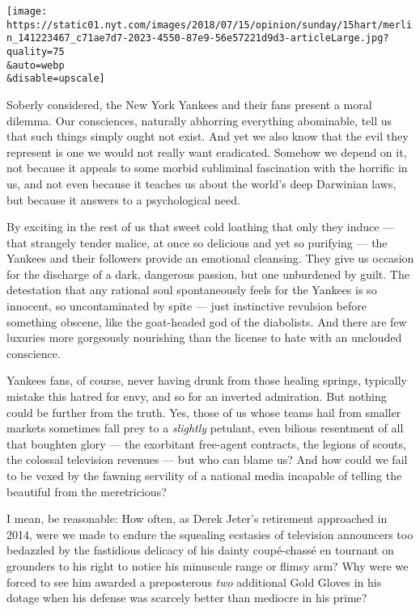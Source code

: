 \texttt{[image: https://static01.nyt.com/images/2018/07/15/opinion/sunday/15hart/merlin\_141223467\_c71ae7d7-2023-4550-87e9-56e57221d9d3-articleLarge.jpg?quality=75\\\&auto=webp\\\&disable=upscale]}

Soberly considered, the New York Yankees and their fans present a moral
dilemma. Our consciences, naturally abhorring everything abominable,
tell us that such things simply ought not exist. And yet we also know
that the evil they represent is one we would not really want eradicated.
Somehow we depend on it, not because it appeals to some morbid
subliminal fascination with the horrific in us, and not even because it
teaches us about the world's deep Darwinian laws, but because it answers
to a psychological need.

By exciting in the rest of us that sweet cold loathing that only they
induce --- that strangely tender malice, at once so delicious and yet so
purifying --- the Yankees and their followers provide an emotional
cleansing. They give us occasion for the discharge of a dark, dangerous
passion, but one unburdened by guilt. The detestation that any rational
soul spontaneously feels for the Yankees is so innocent, so
uncontaminated by spite --- just instinctive revulsion before something
obscene, like the goat-headed god of the diabolists. And there are few
luxuries more gorgeously nourishing than the license to hate with an
unclouded conscience.

Yankees fans, of course, never having drunk from those healing springs,
typically mistake this hatred for envy, and so for an inverted
admiration. But nothing could be further from the truth. Yes, those of
us whose teams hail from smaller markets sometimes fall prey to a
\emph{slightly} petulant, even bilious resentment of all that boughten
glory --- the exorbitant free-agent contracts, the legions of scouts,
the colossal television revenues --- but who can blame us? And how could
we fail to be vexed by the fawning servility of a national media
incapable of telling the beautiful from the meretricious?

I mean, be reasonable: How often, as Derek Jeter's retirement approached
in 2014, were we made to endure the squealing ecstasies of television
announcers too bedazzled by the fastidious delicacy of his dainty
coupé-chassé en tournant on grounders to his right to notice his
minuscule range or flimsy arm? Why were we forced to see him awarded a
preposterous \emph{two} additional Gold Gloves in his dotage when his
defense was scarcely better than mediocre in his prime?

